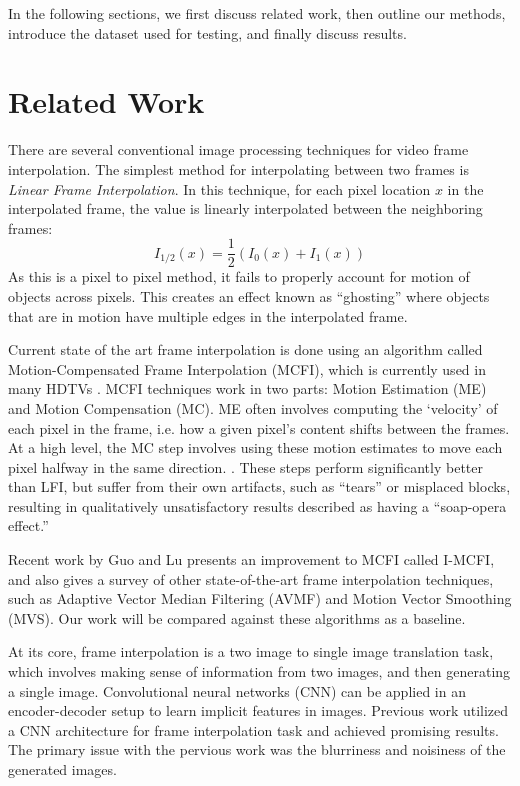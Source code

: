 \documentclass[10pt,twocolumn,letterpaper]{article}
\begin{document}
In the following sections, we first discuss related work, then outline our methods, introduce the dataset used for testing, and finally discuss results.

\section{Related Work}
There are several conventional image processing techniques for video frame interpolation. The simplest method for interpolating between two frames is \textit{Linear Frame Interpolation}. In this technique, for each pixel location $x$ in the interpolated frame, the value is linearly interpolated between the neighboring frames:
\[I_{1/2}(x) = \frac12 ( I_0(x) + I_1(x) )\]
As this is a pixel to pixel method, it fails to properly account for motion of objects across pixels. This creates an effect known as ``ghosting'' where objects that are in motion have multiple edges in the interpolated frame.

Current state of the art frame interpolation is done using an algorithm called Motion-Compensated Frame Interpolation (MCFI), which is currently used in many HDTVs \cite{}. MCFI techniques work in two parts: Motion Estimation (ME) and Motion Compensation (MC). ME often involves computing the `velocity' of each pixel in the frame, i.e. how a given pixel's content shifts between the frames.\cite{} At a high level, the MC step involves using these motion estimates to move each pixel halfway in the same direction. \cite{}. These steps perform significantly better than LFI, but suffer from their own artifacts, such as ``tears'' or misplaced blocks, resulting in qualitatively unsatisfactory results described as having a ``soap-opera effect.''

Recent work by Guo and Lu \cite{} presents an improvement to MCFI called I-MCFI, and also gives a survey of other state-of-the-art frame interpolation techniques, such as Adaptive Vector Median Filtering (AVMF) and Motion Vector Smoothing (MVS). Our work will be compared against these algorithms as a baseline.

At its core, frame interpolation is a two image to single image translation task, which involves making sense of information from two images, and then generating a single image. Convolutional neural networks (CNN) can be applied in an encoder-decoder setup to learn implicit features in images. \cite{?} Previous work \cite{cs229paper} utilized a CNN architecture for frame interpolation task and achieved promising results. The primary issue with the pervious work was the blurriness and noisiness of the generated images.
\end{document}
